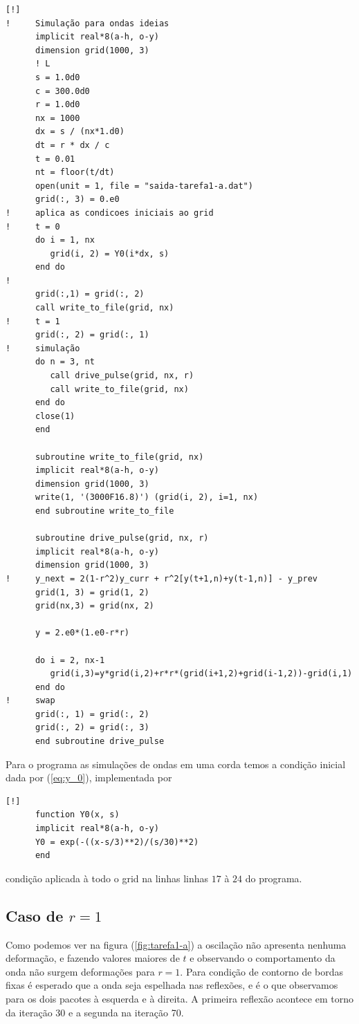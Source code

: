 \documentclass[a4paper, 11pt]{tufte-handout}
\begin{document}
\begin{verbatim}[!]
!     Simulação para ondas ideias
      implicit real*8(a-h, o-y)
      dimension grid(1000, 3)
      ! L 
      s = 1.0d0
      c = 300.0d0
      r = 1.0d0
      nx = 1000
      dx = s / (nx*1.d0)
      dt = r * dx / c
      t = 0.01
      nt = floor(t/dt)
      open(unit = 1, file = "saida-tarefa1-a.dat")
      grid(:, 3) = 0.e0
!     aplica as condicoes iniciais ao grid
!     t = 0
      do i = 1, nx
         grid(i, 2) = Y0(i*dx, s)
      end do
!     
      grid(:,1) = grid(:, 2)
      call write_to_file(grid, nx)
!     t = 1
      grid(:, 2) = grid(:, 1)
!     simulação
      do n = 3, nt
         call drive_pulse(grid, nx, r)
         call write_to_file(grid, nx)
      end do
      close(1)
      end

      subroutine write_to_file(grid, nx)
      implicit real*8(a-h, o-y)
      dimension grid(1000, 3)
      write(1, '(3000F16.8)') (grid(i, 2), i=1, nx)
      end subroutine write_to_file

      subroutine drive_pulse(grid, nx, r)
      implicit real*8(a-h, o-y)
      dimension grid(1000, 3)
!     y_next = 2(1-r^2)y_curr + r^2[y(t+1,n)+y(t-1,n)] - y_prev
      grid(1, 3) = grid(1, 2)
      grid(nx,3) = grid(nx, 2)

      y = 2.e0*(1.e0-r*r)

      do i = 2, nx-1
         grid(i,3)=y*grid(i,2)+r*r*(grid(i+1,2)+grid(i-1,2))-grid(i,1)
      end do
!     swap
      grid(:, 1) = grid(:, 2)
      grid(:, 2) = grid(:, 3)
      end subroutine drive_pulse
\end{verbatim}

Para o programa as simulações de ondas em uma corda temos a condição inicial dada por
(\ref{eq:y_0}), implementada por
\begin{verbatim}[!]
      function Y0(x, s)
      implicit real*8(a-h, o-y)
      Y0 = exp(-((x-s/3)**2)/(s/30)**2)
      end
\end{verbatim}

condição aplicada à todo o grid na linhas linhas $17$ à $24$ do programa.


\subsection{Caso de \( r = 1 \) }

Como podemos ver na figura (\ref{fig:tarefa1-a}) a oscilação não apresenta nenhuma deformação, e
fazendo valores maiores de \( t \) e observando o comportamento da onda não surgem deformações para
\( r = 1 \). Para condição de contorno de bordas fixas é esperado que a onda seja espelhada nas
reflexões, e é o que observamos para os dois pacotes à esquerda e à direita. A primeira reflexão
acontece em torno da iteração 30  e a segunda na iteração 70.
\end{document}
